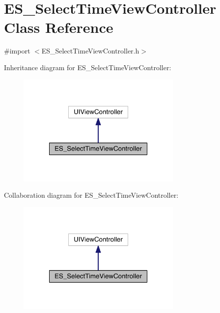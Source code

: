 \hypertarget{interface_e_s___select_time_view_controller}{\section{E\+S\+\_\+\+Select\+Time\+View\+Controller Class Reference}
\label{interface_e_s___select_time_view_controller}
}


{\ttfamily \#import $<$E\+S\+\_\+\+Select\+Time\+View\+Controller.\+h$>$}



Inheritance diagram for E\+S\+\_\+\+Select\+Time\+View\+Controller\+:\nopagebreak
\begin{figure}[H]
\begin{center}
\leavevmode
\includegraphics[width=228pt]{dd/d2e/interface_e_s___select_time_view_controller__inherit__graph}
\end{center}
\end{figure}


Collaboration diagram for E\+S\+\_\+\+Select\+Time\+View\+Controller\+:\nopagebreak
\begin{figure}[H]
\begin{center}
\leavevmode
\includegraphics[width=228pt]{d5/def/interface_e_s___select_time_view_controller__coll__graph}
\end{center}
\end{figure}
